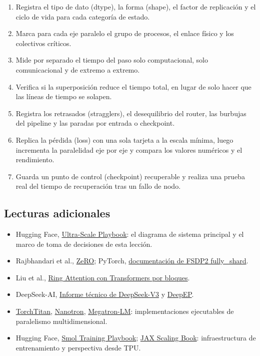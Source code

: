 \begin{enumerate}
  \item Registra el tipo de dato (dtype), la forma (shape), el factor de replicación y el ciclo de vida para cada categoría de estado.
  \item Marca para cada eje paralelo el grupo de procesos, el enlace físico y los colectivos críticos.
  \item Mide por separado el tiempo del paso solo computacional, solo comunicacional y de extremo a extremo.
  \item Verifica si la superposición reduce el tiempo total, en lugar de solo hacer que las líneas de tiempo se solapen.
  \item Registra los retrasados (stragglers), el desequilibrio del router, las burbujas del pipeline y las paradas por entrada o checkpoint.
  \item Replica la pérdida (loss) con una sola tarjeta a la escala mínima, luego incrementa la paralelidad eje por eje y compara los valores numéricos y el rendimiento.
  \item Guarda un punto de control (checkpoint) recuperable y realiza una prueba real del tiempo de recuperación tras un fallo de nodo.
\end{enumerate}

\subsection{Lecturas adicionales}

\begin{itemize}
  \item Hugging Face, \href{https://huggingface.co/spaces/nanotron/ultrascale-playbook}{Ultra-Scale Playbook}: el diagrama de sistema principal y el marco de toma de decisiones de esta lección.
  \item Rajbhandari et al., \href{https://arxiv.org/abs/1910.02054}{ZeRO}; PyTorch, \href{https://docs.pytorch.org/docs/stable/distributed.fsdp.fully_shard.html}{documentación de FSDP2 fully\_shard}.
  \item Liu et al., \href{https://arxiv.org/abs/2310.01889}{Ring Attention con Transformers por bloques}.
  \item DeepSeek-AI, \href{https://arxiv.org/abs/2412.19437}{Informe técnico de DeepSeek-V3} y \href{https://github.com/deepseek-ai/DeepEP}{DeepEP}.
  \item \href{https://github.com/pytorch/torchtitan}{TorchTitan}, \href{https://github.com/huggingface/nanotron}{Nanotron}, \href{https://github.com/NVIDIA/Megatron-LM}{Megatron-LM}: implementaciones ejecutables de paralelismo multidimensional.
  \item Hugging Face, \href{https://huggingface.co/spaces/HuggingFaceTB/smol-training-playbook}{Smol Training Playbook}; \href{https://jax-ml.github.io/scaling-book/tpus/}{JAX Scaling Book}: infraestructura de entrenamiento y perspectiva desde TPU.
\end{itemize}


